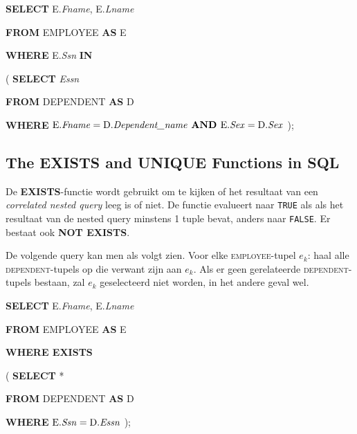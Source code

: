 \vspace{1mm}\hspace{10mm}
\textbf{SELECT} E.\textit{Fname}, E.\textit{Lname}

\hspace{10mm}
\textbf{FROM} EMPLOYEE \textbf{AS} E

\hspace{10mm}
\textbf{WHERE} E.\textit{Ssn} \textbf{IN}

\hspace{40mm}
( \textbf{SELECT} \textit{Essn}

\hspace{40mm}
\phantom{(} \textbf{FROM} DEPENDENT \textbf{AS} D

\hspace{40mm}
\phantom{(} \textbf{WHERE} $\text{E.\textit{Fname}} = \text{D.\textit{Dependent\_name}} \textbf{ AND } \text{E.\textit{Sex}} = \text{D.\textit{Sex}}$ );


\subsection{The EXISTS and UNIQUE Functions in SQL}
De \textbf{EXISTS}-functie wordt gebruikt om te kijken of het resultaat van een \textit{correlated nested query} leeg is of niet. De functie evalueert naar \texttt{TRUE} als als het resultaat van de nested query minstens 1 tuple bevat, anders naar \texttt{FALSE}. Er bestaat ook \textbf{NOT EXISTS}.

De volgende query kan men als volgt zien. Voor elke \textsc{employee}-tupel $e_k$: haal alle \textsc{dependent}-tupels op die verwant zijn aan $e_k$. Als er geen gerelateerde \textsc{dependent}-tupels bestaan, zal $e_k$ geselecteerd niet worden, in het andere geval wel.

\hspace{10mm}
\textbf{SELECT} E.\textit{Fname}, E.\textit{Lname}

\hspace{10mm}
\textbf{FROM} EMPLOYEE \textbf{AS} E

\hspace{10mm}
\textbf{WHERE EXISTS}

\hspace{40mm}
( \textbf{SELECT} *

\hspace{40mm}
\phantom{(} \textbf{FROM} DEPENDENT \textbf{AS} D

\hspace{40mm}
\phantom{(} \textbf{WHERE} $\text{E.\textit{Ssn}} = \text{D.\textit{Essn}}$ );
\vspace{3mm}

